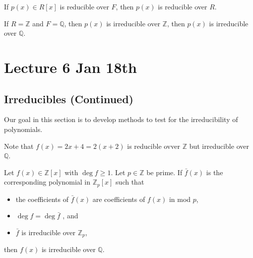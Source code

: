 \documentclass[notoc,notitlepage,nobib]{tufte-book}
\begin{document}
\begin{note}
  If $p(x) \in R[x]$ is reducible over $F$, then $p(x)$ is reducible over $R$.
\end{note}

\begin{note}
  If $R = \mathbb{Z}$ and $F = \mathbb{Q}$, then $p(x)$ is irreducible over
  $\mathbb{Z}$, then $p(x)$ is irreducible over $\mathbb{Q}$.
\end{note}



\chapter{Lecture 6 Jan 18th}%
\label{chp:lecture_6_jan_18th}

\section{Irreducibles (Continued)}%
\label{sec:irreducibles_continued}

Our goal in this section is to develop methods to test for the irreducibility
of polynomials.

\begin{warning}
  Note that $f(x) = 2x + 4 = 2(x + 2)$ is reducible ovver $\mathbb{Z}$
   but
  irreducible over $\mathbb{Q}$.
\end{warning}

\begin{propo}\label{propo:mod_p_irreducibility_test}
  Let $f(x) \in \mathbb{Z}[x]$ with $\deg f \geq 1$. Let $p \in \mathbb{Z}$ be prime.
  If $\bar{f}(x)$ is the corresponding polynomial in $\mathbb{Z}_p[x]$ such that
  \begin{itemize}
    \item the coefficients of $\bar{f}(x)$ are coefficients of $f(x)$ in mod $p$,
    \item $\deg f = \deg \bar{f}$ , and
    \item $\bar{f}$ is irreducible over $\mathbb{Z}_p$,
  \end{itemize}
  then $f(x)$ is irreducible over $\mathbb{Q}$.
\end{propo}
\end{document}
